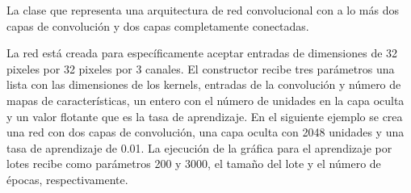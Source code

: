 La clase que representa una arquitectura de red convolucional con a lo más
dos capas de convolución y dos capas completamente conectadas.

La red está creada para específicamente aceptar entradas de dimensiones
de 32 pixeles por 32 pixeles por 3 canales. El constructor recibe tres parámetros
una lista con las dimensiones de los kernels, entradas de la convolución y
número de mapas de características, un entero con el número de unidades en la
capa oculta y un valor flotante que es la tasa de aprendizaje.
En el siguiente ejemplo se crea una red con dos capas de convolución,
una capa oculta con 2048 unidades y una tasa de aprendizaje de 0.01. La ejecución de la gráfica
para el aprendizaje por lotes recibe como parámetros 200 y 3000,
el tamaño del lote y el número de épocas, respectivamente.

%
\begin{sphinxVerbatim}[commandchars=\\\{\}]
   
  \PYG{p}{[}\PYG{p}{[}   \PYG{p}{]} \PYG{p}{[}   \PYG{p}{]}\PYG{p}{]}  
 
\end{sphinxVerbatim}





